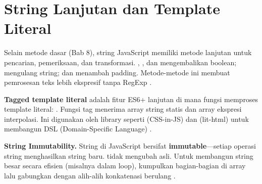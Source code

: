 \section{String Lanjutan dan Template Literal}

Selain metode dasar (Bab 8), string JavaScript memiliki metode lanjutan untuk pencarian, pemeriksaan, dan transformasi. , , dan  mengembalikan boolean;  mengulang string;  dan  menambah padding. Metode-metode ini membuat pemrosesan teks lebih ekspresif tanpa RegExp \cite{jsInfo}.

\textbf{Tagged template literal} adalah fitur ES6+ lanjutan di mana fungsi memproses template literal: . Fungsi tag menerima array string statis dan array ekspresi interpolasi. Ini digunakan oleh library seperti  (CSS-in-JS) dan  (lit-html) untuk membangun DSL (Domain-Specific Language) \cite{mdnJsGuide}.

\begin{catatan}
\textbf{String Immutability.} String di JavaScript bersifat \textbf{immutable}---setiap operasi string menghasilkan string baru.  tidak mengubah  asli. Untuk membangun string besar secara efisien (misalnya dalam loop), kumpulkan bagian-bagian di array lalu gabungkan dengan  alih-alih konkatenasi berulang \cite{jsInfo}.
\end{catatan}

